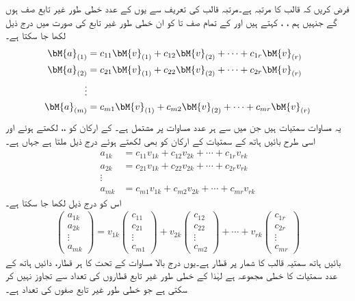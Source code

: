 فرض کریں کہ  قالب  کا مرتبہ  ہے۔مرتبہ قالب کی تعریف سے یوں  کے  عدد خطی طور غیر تابع صف ہوں گے جنہیں ہم ، ،  کہتے ہیں اور  کے تمام صف  تا  کو ان خطی طور غیر تابع کی صورت میں درج ذیل لکھا جا سکتا ہے۔
\begin{align*}
\bM{a}_{(1)}&=c_{11}\bM{v}_{(1)}+c_{12}\bM{v}_{(2)}+\cdots+c_{1r}\bM{v}_{(r)}\\
\bM{a}_{(2)}&=c_{21}\bM{v}_{(1)}+c_{22}\bM{v}_{(2)}+\cdots+c_{2r}\bM{v}_{(r)}\\
\vdots\\
\bM{a}_{(m)}&=c_{m1}\bM{v}_{(1)}+c_{m2}\bM{v}_{(2)}+\cdots+c_{mr}\bM{v}_{(r)}
\end{align*}
یہ مساوات سمتیات ہیں جن میں سے ہر  عدد مساوات پر مشتمل ہے۔ کے ارکان کو ،، لکھتے ہوئے اور اسی طرح بائیں ہاتھ کے سمتیات کے ارکان کو بھی لکھتے ہوئے درج ذیل ملتا ہے جہاں  ہے۔
\begin{align*}
a_{1k}&=c_{11}v_{1k}+c_{12}v_{2k}+\cdots+c_{1r}v_{rk}\\
a_{2k}&=c_{21}v_{1k}+c_{22}v_{2k}+\cdots+c_{2r}v_{rk}\\
\vdots\\
a_{mk}&=c_{m1}v_{1k}+c_{m2}v_{2k}+\cdots+c_{mr}v_{rk}
\end{align*} 
اس کو درج ذیل لکھا جا سکتا ہے۔
\begin{align*}
\begin{pmatrix}a_{1k}\\a_{2k}\\ \vdots\\ a_{mk}\end{pmatrix}=
v_{1k}\begin{pmatrix}c_{11}\\ c_{21} \\ \vdots\\ c_{m1}   \end{pmatrix}+v_{2k}\begin{pmatrix}c_{12}\\ c_{22} \\ \vdots\\ c_{m2}   \end{pmatrix}+\cdots+v_{rk}\begin{pmatrix}c_{1r}\\ c_{2r} \\ \vdots\\ c_{mr}   \end{pmatrix}
\end{align*}
بائیں ہاتھ سمتیہ  قالب کا  شمار پر قطار ہے۔یوں درج بالا مساوات کے تحت  کا ہر قطار، دائیں ہاتھ کے  عدد سمتیات کا خطی مجموعہ ہے لہٰذا  کے خطی طور غیر تابع قطاروں کی تعداد  سے تجاوز نہیں کر سکتی ہے جو خطی طور غیر تابع صفوں کی تعداد ہے۔

